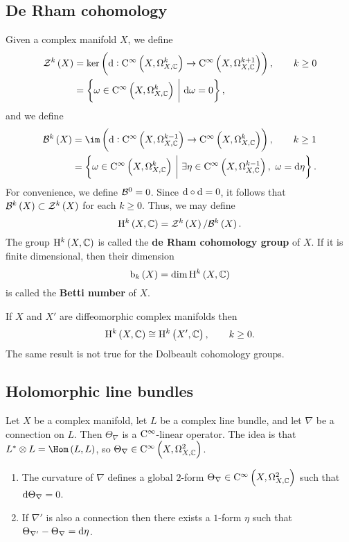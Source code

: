 \pagebreak

\subsection{De Rham cohomology}

Given a complex manifold $ X $, we define
\begin{align*}
\ZZZ^k\br{X}
& = \ker \br{\d : \COC{X}{k} \to \COC{X}{k + 1}}, \qquad k \ge 0 \\
& = \cbr{\omega \in \COC{X}{k} \st \d\omega = 0},
\end{align*}
and we define
\begin{align*}
\BBB^k\br{X}
& = \im \br{\d : \COC{X}{k - 1} \to \COC{X}{k}}, \qquad k \ge 1 \\
& = \cbr{\omega \in \COC{X}{k} \st \exists \eta \in \COC{X}{k - 1}, \ \omega = \d\eta}.
\end{align*}
For convenience, we define $ \mathcal{B}^0 = 0 $. Since $ \mathrm{d} \circ \mathrm{d} = 0 $, it follows that $ \BBB^k\br{X} \subset \ZZZ^k\br{X} $ for each $ k \ge 0 $. Thus, we may define
$$ \H^k\br{X, \CC} = \ZZZ^k\br{X} / \BBB^k\br{X}. $$
The group $ \H^k\br{X, \CC} $ is called the \textbf{de Rham cohomology group} of $ X $. If it is finite dimensional, then their dimension
$$ \b_k\br{X} = \dim \H^k\br{X, \CC} $$
is called the \textbf{Betti number} of $ X $.

\begin{remark}
If $ X $ and $ X' $ are diffeomorphic complex manifolds then
$$ \H^k\br{X, \CC} \cong \H^k\br{X', \CC}, \qquad k \ge 0. $$
The same result is not true for the Dolbeault cohomology groups.
\end{remark}

\subsection{Holomorphic line bundles}

Let $ X $ be a complex manifold, let $ L $ be a complex line bundle, and let $ \nabla $ be a connection on $ L $. Then $ \Theta_\nabla $ is a $ \mathrm{C}^\infty $-linear operator. The idea is that $ L^* \otimes L = \Hom\br{L, L} $, so $ \Theta_\nabla \in \COC{X}{2} $.

\begin{proposition}
\hfill
\begin{enumerate}
\item The curvature of $ \nabla $ defines a global $ 2 $-form $ \Theta_\nabla \in \COC{X}{2} $ such that $ \mathrm{d}\Theta_\nabla = 0 $.
\item If $ \nabla' $ is also a connection then there exists a $ 1 $-form $ \eta $ such that $ \Theta_{\nabla'} - \Theta_\nabla = \mathrm{d}\eta $.
\end{enumerate}
\end{proposition}

